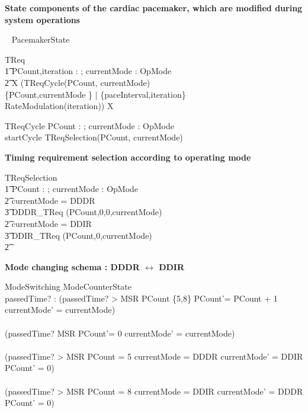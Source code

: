 \textbf{State components of the cardiac pacemaker, which are modified during system operations}

\begin{circusaction}
  \circstate ~ PacemakerState
\end{circusaction}

\begin{circusaction}
TReq \circdef \\
\t1 \circvres PCount,iteration : \nat ; \circvres currentMode : OpMode \\
\t2 \circspot \circmu X \circspot (TReqCycle(PCount, currentMode) \\
\linter \{PCount,currentMode \} | \{paceInterval,iteration\}  \rinter \\
RateModulation(iteration)) \circseq X \\
\end{circusaction}



\begin{circusaction}
	TReqCycle \circdef \circvres PCount : \nat ; \circvres currentMode : OpMode \circspot\\
	startCycle \then TReqSelection(PCount, currentMode)\\
\end{circusaction}


\textbf{ Timing requirement selection according to operating mode}\\
\begin{circusaction}
TReqSelection \circdef \\
\t1 \circvres PCount : \nat; \circvres currentMode : OpMode \circspot \\
\t2 \circif  currentMode = DDDR \circthen \\
\t3 DDDR\_TReq (PCount,0,0,currentMode) \\ 
\t2 \circelse currentMode = DDIR \circthen \\
\t3 DDIR\_TReq (PCount,0,currentMode)  \\ 
\t2 \circfi
\end{circusaction}




\textbf{Mode changing schema : DDDR $\leftrightarrow$ DDIR}

\begin{schema}{ModeSwitching}
 \Delta ModeCounterState\\
  passedTime? : \nat 
\where
(passedTime? > MSR \land PCount \notin \{5,8\} \land PCount'= PCount + 1 \land currentMode' = currentMode)\\
\lor \\
(passedTime? \leq MSR \land PCount'= 0 \land currentMode' = currentMode)\\
\lor \\
(passedTime? > MSR \land PCount = 5 \land currentMode = DDDR \land currentMode' = DDIR \land PCount' = 0) \\
\lor \\
(passedTime? > MSR \land PCount = 8 \land currentMode = DDIR \land currentMode' = DDDR \land PCount' = 0) \\
\end{schema}


